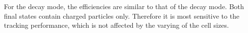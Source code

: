 For the \decayAiPionShort decay mode, the efficiencies are similar to that of the \decayPionShort decay mode. Both final states contain charged particles only. Therefore it is most sensitive to the tracking performance, which is not affected by the  varying of the \ECAL cell sizes.













